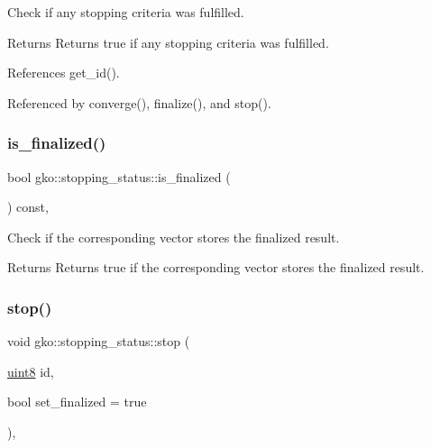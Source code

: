 Check if any stopping criteria was fulfilled. 

\begin{DoxyReturn}{Returns}
Returns true if any stopping criteria was fulfilled. 
\end{DoxyReturn}


References get\+\_\+id().



Referenced by converge(), finalize(), and stop().

\mbox{\label{classgko_1_1stopping__status_a7c8b094d37449098ca4ddb1f4bbf10bd}} 
\subsubsection{\texorpdfstring{is\+\_\+finalized()}{is\_finalized()}}
{\footnotesize\ttfamily bool gko\+::stopping\+\_\+status\+::is\+\_\+finalized (\begin{DoxyParamCaption}{ }\end{DoxyParamCaption}) const\hspace{0.3cm}{\ttfamily [inline]}, {\ttfamily [noexcept]}}



Check if the corresponding vector stores the finalized result. 

\begin{DoxyReturn}{Returns}
Returns true if the corresponding vector stores the finalized result. 
\end{DoxyReturn}
\mbox{\label{classgko_1_1stopping__status_ab13d4f214328c9574fdef6168c671de0}} 
\subsubsection{\texorpdfstring{stop()}{stop()}}
{\footnotesize\ttfamily void gko\+::stopping\+\_\+status\+::stop (\begin{DoxyParamCaption}\item[{\hyperlink{namespacegko_a3950fc3732811a8563484e5098c31531}{uint8}}]{id,  }\item[{bool}]{set\+\_\+finalized = {\ttfamily true} }\end{DoxyParamCaption})\hspace{0.3cm}{\ttfamily [inline]}, {\ttfamily [noexcept]}}



